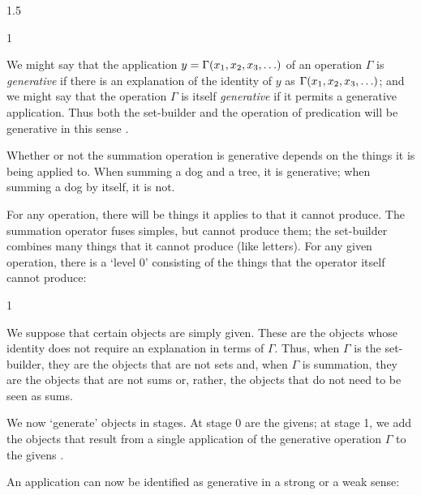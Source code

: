 \documentclass[11pt]{article}
\newenvironment{squote}{%
\begin{spacing}{1}
\begin{list}{}{%
\setlength{\labelwidth}{0pt}%
\rightmargin\leftmargin%
}
\item\relax
}{%
\end{list}%
\end{spacing}
}
\begin{document}
\begin{spacing}{1.5}
\begin{squote}
We might say that the application $y = \Gamma (x_1, x_2, x_3,
\mathellipsis )$ of an operation $\Gamma$ is {\em generative} if there
is an explanation of the identity of $y$ as $\Gamma (x_1, x_2, x_3,
\mathellipsis )$; and we might say that the operation $\Gamma$ is
itself {\em generative} if it permits a generative application. Thus
both the set-builder and the operation of predication will be
generative in this sense \citeyearpar[582]{fine2010}.
\end{squote}

Whether or not the summation operation is generative depends on the
things it is being applied to.  When summing a dog and a tree, it is
generative; when summing a dog by itself, it is not.

For any operation, there will be things it applies to that it cannot
produce.  The summation operator fuses simples, but cannot produce
them; the set-builder combines many things that it cannot produce
(like letters).  For any given operation, there is a `level 0'
consisting of the things that the operator itself cannot produce:

\begin{squote}
We suppose that certain objects are simply given.  These are the
objects whose identity does not require an explanation in terms of
$\Gamma$.  Thus, when $\Gamma$ is the set-builder, they are the
objects that are not sets and, when $\Gamma$ is summation, they are
the objects that are not sums or, rather, the objects that do not need
to be seen as sums.

We now `generate' objects in stages.  At stage 0 are the givens; at
stage 1, we add the objects that result from a single application of
the generative operation $\Gamma$ to the givens \citep[583]{fine2010}.
\end{squote}

An application can now be identified as generative in a strong or a
weak sense:


\end{spacing}
\end{document}
